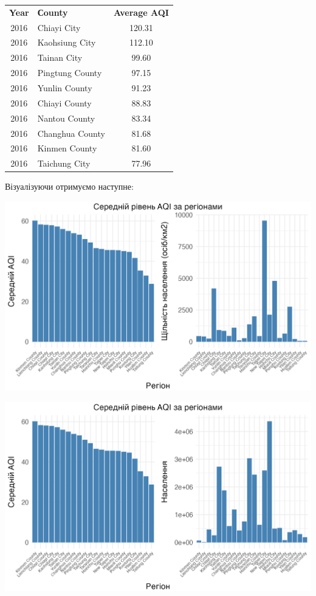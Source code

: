 \documentclass[./report.tex]{subfiles}
\begin{document}
\begin{enumerate}
  \begin{tabular}{clc}
    \textbf{Year} & \textbf{Сounty} & \textbf{Average AQI} \\
    2016 & Chiayi City     & 120.31 \\
    2016 & Kaohsiung City  & 112.10 \\
    2016 & Tainan City     & 99.60  \\
    2016 & Pingtung County & 97.15  \\
    2016 & Yunlin County   & 91.23  \\
    2016 & Chiayi County   & 88.83  \\
    2016 & Nantou County   & 83.34  \\
    2016 & Changhua County & 81.68  \\
    2016 & Kinmen County   & 81.60  \\
    2016 & Taichung City   & 77.96  \\
  \end{tabular}

  Візуалізуючи отримуємо наступне:

  \includegraphics[width=\linewidth]{plots/question4/avg_aqi_by_county_w_dens.png}

  \includegraphics[width=\linewidth]{plots/question4/avg_aqi_by_county_w_pop.png}


\end{enumerate}
\end{document}
